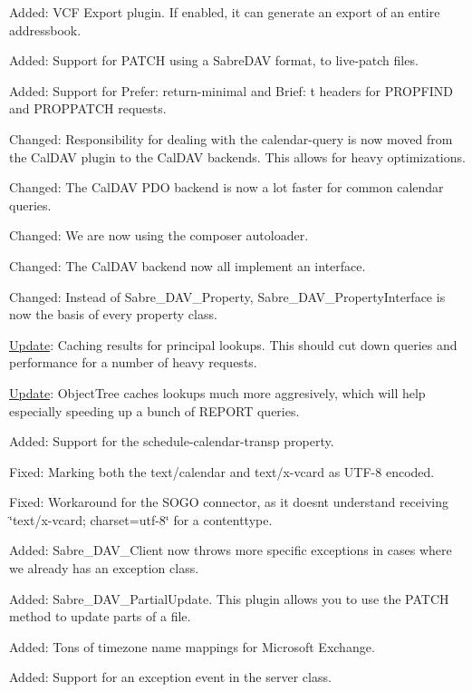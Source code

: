 \begin{DoxyItemize}
\item Added\+: V\+CF Export plugin. If enabled, it can generate an export of an entire addressbook.
\item Added\+: Support for P\+A\+T\+CH using a Sabre\+D\+AV format, to live-\/patch files.
\item Added\+: Support for Prefer\+: return-\/minimal and Brief\+: t headers for P\+R\+O\+P\+F\+I\+ND and P\+R\+O\+P\+P\+A\+T\+CH requests.
\item Changed\+: Responsibility for dealing with the calendar-\/query is now moved from the Cal\+D\+AV plugin to the Cal\+D\+AV backends. This allows for heavy optimizations.
\item Changed\+: The Cal\+D\+AV P\+DO backend is now a lot faster for common calendar queries.
\item Changed\+: We are now using the composer autoloader.
\item Changed\+: The Cal\+D\+AV backend now all implement an interface.
\item Changed\+: Instead of Sabre\+\_\+\+D\+A\+V\+\_\+\+Property, Sabre\+\_\+\+D\+A\+V\+\_\+\+Property\+Interface is now the basis of every property class.
\item \mbox{\hyperlink{class_update}{Update}}\+: Caching results for principal lookups. This should cut down queries and performance for a number of heavy requests.
\item \mbox{\hyperlink{class_update}{Update}}\+: Object\+Tree caches lookups much more aggresively, which will help especially speeding up a bunch of R\+E\+P\+O\+RT queries.
\item Added\+: Support for the schedule-\/calendar-\/transp property.
\item Fixed\+: Marking both the text/calendar and text/x-\/vcard as U\+T\+F-\/8 encoded.
\item Fixed\+: Workaround for the S\+O\+GO connector, as it doesn\textquotesingle{}t understand receiving \char`\"{}text/x-\/vcard; charset=utf-\/8\char`\"{} for a contenttype.
\item Added\+: Sabre\+\_\+\+D\+A\+V\+\_\+\+Client now throws more specific exceptions in cases where we already has an exception class.
\item Added\+: Sabre\+\_\+\+D\+A\+V\+\_\+\+Partial\+Update. This plugin allows you to use the P\+A\+T\+CH method to update parts of a file.
\item Added\+: Tons of timezone name mappings for Microsoft Exchange.
\item Added\+: Support for an \textquotesingle{}exception\textquotesingle{} event in the server class.

\end{DoxyItemize}
